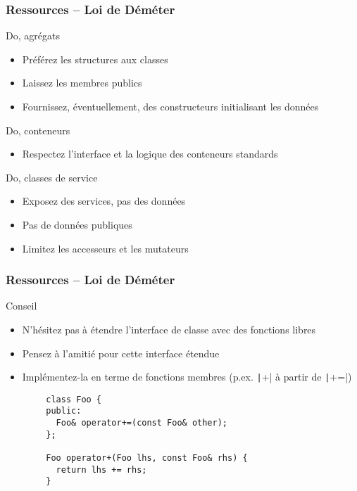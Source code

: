 \documentclass[C++.tex]{subfiles}
\begin{document}
\begin{frame}[fragile]
	\frametitle{Ressources -- Loi de Déméter}
	\begin{exampleblock}{Do, agrégats}
		\begin{itemize}
			\item Préférez les structures aux classes
			\item Laissez les membres publics
			\item Fournissez, éventuellement, des constructeurs initialisant les données
		\end{itemize}

	\end{exampleblock}

	\begin{exampleblock}{Do, conteneurs}
		\begin{itemize}
			\item Respectez l'interface et la logique des conteneurs standards
		\end{itemize}
	\end{exampleblock}

	\begin{exampleblock}{Do, classes de service}
		\begin{itemize}
			\item Exposez des services, pas des données
			\item Pas de données publiques
			\item Limitez les accesseurs et les mutateurs
		\end{itemize}
	\end{exampleblock}
\end{frame}

\begin{frame}[fragile]
	\frametitle{Ressources -- Loi de Déméter}
	\begin{block}{Conseil}
		\begin{itemize}
			\item N'hésitez pas à étendre l'interface de classe avec des fonctions libres
			\item Pensez à l'amitié pour cette interface étendue
			\item Implémentez-la en terme de fonctions membres (p.ex. \texttt|+| à partir de \texttt|+=|)
		\end{itemize}
	\end{block}

	\begin{verbatim}
		class Foo {
		public:
		  Foo& operator+=(const Foo& other);
		};

		Foo operator+(Foo lhs, const Foo& rhs) {
		  return lhs += rhs;
		}
	\end{verbatim}
\end{frame}
\end{document}
